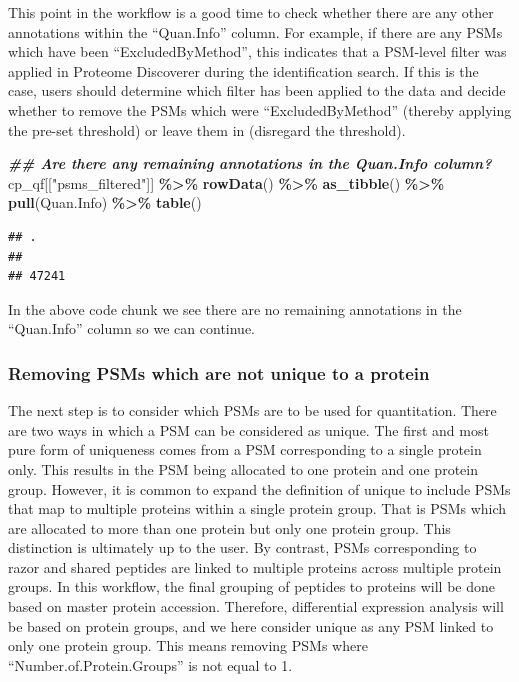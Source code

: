 \documentclass[9pt,a4paper,]{extarticle}
\newenvironment{Shaded}{\begin{snugshade}}{\end{snugshade}}
\newcommand{\DocumentationTok}[1]{\textcolor[rgb]{0.56,0.35,0.01}{\textbf{\textit{#1}}}}
\newcommand{\FunctionTok}[1]{\textcolor[rgb]{0.13,0.29,0.53}{\textbf{#1}}}
\newcommand{\NormalTok}[1]{#1}
\newcommand{\SpecialCharTok}[1]{\textcolor[rgb]{0.81,0.36,0.00}{\textbf{#1}}}
\newcommand{\StringTok}[1]{\textcolor[rgb]{0.31,0.60,0.02}{#1}}
\begin{document}
This point in the workflow is a good time to check whether there are any other
annotations within the ``Quan.Info'' column. For example, if there are any PSMs
which have been ``ExcludedByMethod'', this indicates that a PSM-level filter was
applied in Proteome Discoverer during the identification search. If this is the
case, users should determine which filter has been applied to the data and
decide whether to remove the PSMs which were ``ExcludedByMethod'' (thereby applying
the pre-set threshold) or leave them in (disregard the threshold).

\begin{Shaded}
\begin{Highlighting}[]
\DocumentationTok{\#\# Are there any remaining annotations in the Quan.Info column?}
\NormalTok{cp\_qf[[}\StringTok{"psms\_filtered"}\NormalTok{]] }\SpecialCharTok{\%\textgreater{}\%} 
  \FunctionTok{rowData}\NormalTok{() }\SpecialCharTok{\%\textgreater{}\%} 
  \FunctionTok{as\_tibble}\NormalTok{() }\SpecialCharTok{\%\textgreater{}\%} 
  \FunctionTok{pull}\NormalTok{(Quan.Info) }\SpecialCharTok{\%\textgreater{}\%} 
  \FunctionTok{table}\NormalTok{()}
\end{Highlighting}
\end{Shaded}

\begin{verbatim}
## .
##       
## 47241
\end{verbatim}

In the above code chunk we see there are no remaining annotations in the
``Quan.Info'' column so we can continue.

\hypertarget{removing-psms-which-are-not-unique-to-a-protein}{%
\subsubsection{Removing PSMs which are not unique to a protein}\label{removing-psms-which-are-not-unique-to-a-protein}}

The next step is to consider which PSMs are to be used for quantitation. There
are two ways in which a PSM can be considered as unique. The first and most pure
form of uniqueness comes from a PSM corresponding to a single protein only. This
results in the PSM being allocated to one protein and one protein group.
However, it is common to expand the definition of unique to include PSMs that
map to multiple proteins within a single protein group. That is PSMs which are
allocated to more than one protein but only one protein group. This distinction
is ultimately up to the user. By contrast, PSMs corresponding to razor and
shared peptides are linked to multiple proteins across multiple protein groups.
In this workflow, the final grouping of peptides to proteins will be done based
on master protein accession. Therefore, differential expression analysis will be
based on protein groups, and we here consider unique as any PSM linked to only
one protein group. This means removing PSMs where ``Number.of.Protein.Groups'' is
not equal to 1.
\end{document}
